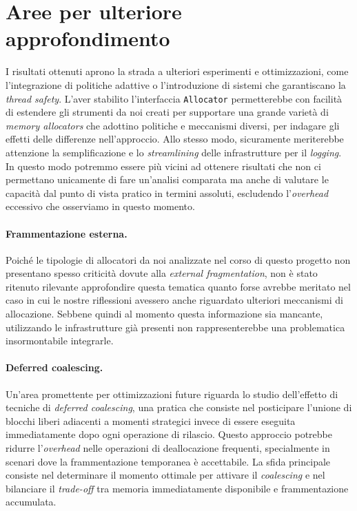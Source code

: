 \section{Aree per ulteriore approfondimento}

I risultati ottenuti aprono la strada a ulteriori esperimenti e ottimizzazioni, come l’integrazione di politiche adattive o l'introduzione di sistemi che garantiscano la \textit{thread safety}. L'aver stabilito l'interfaccia \texttt{Allocator} permetterebbe con facilità di estendere gli strumenti da noi creati per supportare una grande varietà di \textit{memory allocators} che adottino politiche e meccanismi diversi, per indagare gli effetti delle differenze nell'approccio. Allo stesso modo, sicuramente meriterebbe attenzione la semplificazione e lo \textit{streamlining} delle infrastrutture per il \textit{logging}. In questo modo potremmo essere più vicini ad ottenere risultati che non ci permettano unicamente di fare un'analisi comparata ma anche di valutare le capacità dal punto di vista pratico in termini assoluti, escludendo l'\textit{overhead} eccessivo che osserviamo in questo momento.

\paragraph{Frammentazione esterna.}
Poiché le tipologie di allocatori da noi analizzate nel corso di questo progetto non presentano spesso criticità dovute alla \textit{external fragmentation}, non è stato ritenuto rilevante approfondire questa tematica quanto forse avrebbe meritato nel caso in cui le nostre riflessioni avessero anche riguardato ulteriori meccanismi di allocazione. Sebbene quindi al momento questa informazione sia mancante, utilizzando le infrastrutture già presenti non rappresenterebbe una problematica insormontabile integrarle.

\paragraph{Deferred coalescing.}
Un'area promettente per ottimizzazioni future riguarda lo studio dell'effetto di tecniche di \textit{deferred coalescing}, una pratica che consiste nel posticipare l'unione di blocchi liberi adiacenti a momenti strategici invece di essere eseguita immediatamente dopo ogni operazione di rilascio. Questo approccio potrebbe ridurre l'\textit{overhead} nelle operazioni di deallocazione frequenti, specialmente in scenari dove la frammentazione temporanea è accettabile. La sfida principale consiste nel determinare il momento ottimale per attivare il \textit{coalescing} e nel bilanciare il \textit{trade-off} tra memoria immediatamente disponibile e frammentazione accumulata.

